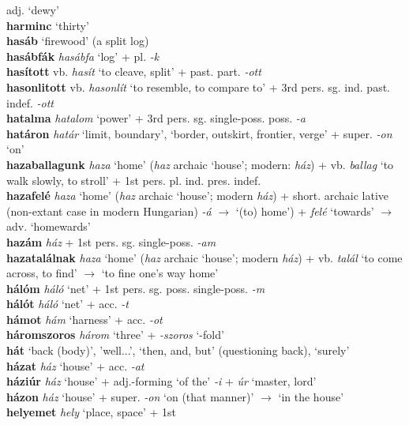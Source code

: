 \documentclass[11pt]{article}
\begin{document}
adj. `dewy' \\ \textbf{harminc} `thirty' \\ \textbf{hasáb} `firewood'
(a split log) \\ \textbf{hasábfák} \emph{hasábfa} `log' +
pl. \emph{-k} \\ \textbf{hasított} vb. \emph{hasít} `to cleave, split'
+ past. part. \emph{-ott} \\ \textbf{hasonlitott} vb. \emph{hasonlít}
`to resemble, to compare to' + 3rd
pers. sg. ind. past. indef. \emph{-ott} \\ \textbf{hatalma}
\emph{hatalom} `power' + 3rd
pers. sg. single\hyp{}poss. poss. \emph{-a} \\ \textbf{határon}
\emph{határ} `limit, boundary', `border, outskirt, frontier, verge' +
super. \emph{-on} `on' \\ \textbf{hazaballagunk} \emph{haza} `home'
(\emph{haz} archaic `house'; modern: \emph{ház}) + vb. \emph{ballag} `to
walk slowly, to stroll' + 1st
pers. pl. ind. pres. indef. \\ \textbf{hazafelé} \emph{haza} `home'
(\emph{haz} archaic `house'; modern \emph{ház}) + short. archaic lative
(non\hyp{}extant case in modern Hungarian) \emph{-á} $\rightarrow$
`(to) home') + \emph{felé} `towards' $\rightarrow$ adv. `homewards'
\\ \textbf{hazám} \emph{ház} + 1st
pers. sg. single\hyp{}poss. \emph{-am} \\ \textbf{hazatalálnak}
\emph{haza} `home' (\emph{haz} archaic `house'; modern \emph{ház}) +
vb. \emph{talál} `to come across, to find' $\rightarrow$ `to fine
one's way home' \\ \textbf{hálóm} \emph{háló} `net' + 1st
pers. sg. poss. single\hyp{}poss. \emph{-m} \\ \textbf{hálót}
\emph{háló} `net' + acc. \emph{-t} \\ \textbf{hámot} \emph{hám}
`harness' + acc. \emph{-ot} \\ \textbf{háromszoros} \emph{három}
`three' + \emph{-szoros} `-fold' \\ \textbf{hát} `back (body)',
'well...', `then, and, but' (questioning back), `surely'
\\ \textbf{házat} \emph{ház} `house' + acc. \emph{-at}
\\ \textbf{háziúr} \emph{ház} `house' + adj.\hyp{}forming `of the'
\emph{-i} + \emph{úr} `master, lord' \\ \textbf{házon} \emph{ház}
`house' + super. \emph{-on} `on (that manner)' $\rightarrow$ `in the
house'\\ \textbf{helyemet} \emph{hely} `place, space' + 1st
\end{document}

